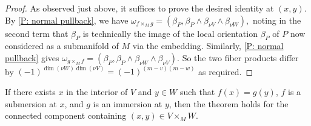 \begin{proof}
	As observed just above, it suffices to prove the desired identity at $(x,y)$.
	By \cref{P: normal pullback}, we have $\omega_{f\times_M g}=(\beta_P,\beta_P\wedge \beta_{\nu V}\wedge \beta_{\nu W}),$ noting in the second term that $\beta_P$ is technically the image of the local orientation $\beta_P$ of $P$ now considered as a submanifold of $M$ via the embedding.
	Similarly, \cref{P: normal pullback} gives
	$\omega_{g\times_M f}=(\beta_P,\beta_P\wedge \beta_{\nu W}\wedge \beta_{\nu V})$.
	So the two fiber products differ by $(-1)^{\dim(\nu W)\dim(\nu V)}=(-1)^{(m-v)(m-w)}$ as required.
\end{proof}

\begin{lemma}\label{L: im/sub}
	If there exists $x$ in the interior of $V$ and $y\in W$ such that $f(x)=g(y)$, $f$ is a submersion at $x$, and $g$ is an immersion at $y$, then the theorem holds for the connected component containing $(x,y)\in V\times_MW$.
\end{lemma}

